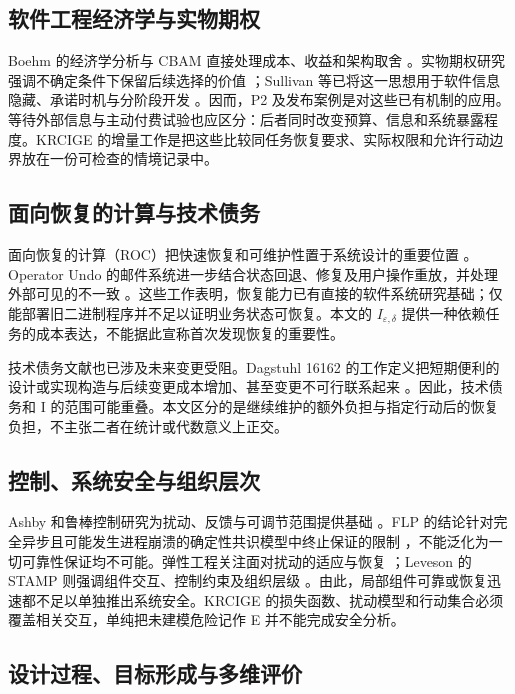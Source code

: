 \documentclass[11pt,a4paper]{ctexart}
\numberwithin{equation}{section}
\theoremstyle{definition}
\theoremstyle{plain}
\begin{document}
\subsection{软件工程经济学与实物期权}

Boehm 的经济学分析与 CBAM 直接处理成本、收益和架构取舍 \cite{boehm1981,asundi2001}。实物期权研究强调不确定条件下保留后续选择的价值 \cite{dixit1994}；Sullivan 等已将这一思想用于软件信息隐藏、承诺时机与分阶段开发 \cite{sullivan1999}。因而，P2 及发布案例是对这些已有机制的应用。等待外部信息与主动付费试验也应区分：后者同时改变预算、信息和系统暴露程度。KRCIGE 的增量工作是把这些比较同任务恢复要求、实际权限和允许行动边界放在一份可检查的情境记录中。

\subsection{面向恢复的计算与技术债务}

面向恢复的计算（ROC）把快速恢复和可维护性置于系统设计的重要位置 \cite{patterson2002}。Operator Undo 的邮件系统进一步结合状态回退、修复及用户操作重放，并处理外部可见的不一致 \cite{brown2003}。这些工作表明，恢复能力已有直接的软件系统研究基础；仅能部署旧二进制程序并不足以证明业务状态可恢复。本文的 $I_{\varepsilon,\delta}$ 提供一种依赖任务的成本表达，不能据此宣称首次发现恢复的重要性。

技术债务文献也已涉及未来变更受阻。Dagstuhl 16162 的工作定义把短期便利的设计或实现构造与后续变更成本增加、甚至变更不可行联系起来 \cite{avgeriou2016}。因此，技术债务和 I 的范围可能重叠。本文区分的是继续维护的额外负担与指定行动后的恢复负担，不主张二者在统计或代数意义上正交。

\subsection{控制、系统安全与组织层次}

Ashby 和鲁棒控制研究为扰动、反馈与可调节范围提供基础 \cite{ashby1956,skogestad2005}。FLP 的结论针对完全异步且可能发生进程崩溃的确定性共识模型中终止保证的限制 \cite{flp1985}，不能泛化为一切可靠性保证均不可能。弹性工程关注面对扰动的适应与恢复 \cite{hollnagel2006}；Leveson 的 STAMP 则强调组件交互、控制约束及组织层级 \cite{leveson2004}。由此，局部组件可靠或恢复迅速都不足以单独推出系统安全。KRCIGE 的损失函数、扰动模型和行动集合必须覆盖相关交互，单纯把未建模危险记作 E 并不能完成安全分析。

\subsection{设计过程、目标形成与多维评价}
\end{document}
